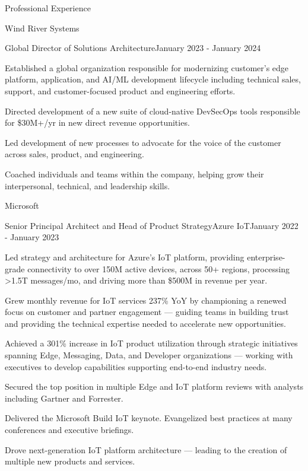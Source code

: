 \documentclass{resume} %
\begin{document}
\begin{rSection}{Professional Experience}
\begin{rCompany}{Wind River Systems}{}{}
    \begin{rSubSubsection}{Global Director of Solutions Architecture}{}{January 2023 - January 2024}
      \item Established a global organization responsible for modernizing customer's edge platform, application, and AI/ML development lifecycle including technical sales, support, and customer-focused product and engineering efforts.
      \item Directed development of a new suite of cloud-native DevSecOps tools responsible for \$30M+/yr in new direct revenue opportunities.
      \item Led development of new processes to advocate for the voice of the customer across sales, product, and engineering.
      \item Coached individuals and teams within the company, helping grow their interpersonal, technical, and leadership skills.
    \end{rSubSubsection}
  \end{rCompany}

  \begin{rCompany}{Microsoft}{}{}

     \begin{rSubSubsection}{Senior Principal Architect and Head of Product Strategy}{Azure IoT}{January 2022 - January 2023}
        \item Led strategy and architecture for Azure's IoT platform, providing enterprise-grade connectivity to over 150M active devices, across 50+ regions, processing >1.5T messages/mo, and driving more than \$500M in revenue per year.
        \item Grew monthly revenue for IoT services 237\% YoY by championing a renewed focus on customer and partner engagement --- guiding teams in building trust and providing the technical expertise needed to accelerate new opportunities.
        \item Achieved a 301\% increase in IoT product utilization through strategic initiatives spanning Edge, Messaging, Data, and Developer organizations --- working with executives to develop capabilities supporting end-to-end industry needs.
        \item Secured the top position in multiple Edge and IoT platform reviews with analysts including Gartner and Forrester.
        \item Delivered the Microsoft Build IoT keynote. Evangelized best practices at many conferences and executive briefings.
        \item Drove next-generation IoT platform architecture --- leading to the creation of multiple new products and services.
    

\end{rSubSubsection}
\end{rCompany}
\end{rSection}
\end{document}
